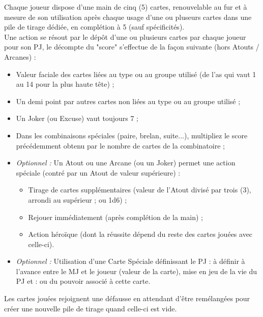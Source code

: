 \documentclass[11pt,twoside,a4paper]{article}
\begin{document}
Chaque joueur dispose d'une main de cinq (5) cartes, renouvelable au fur et {\`a} mesure de son utilisation apr{\`e}s chaque usage d'une ou pluseurs cartes dans une pile de tirage d{\'e}di{\'e}e, en compl{\'e}tion {\`a} 5 (sauf sp{\'e}cificit{\'e}s).~\\
Une action se r{\'e}sout par le d{\'e}p{\^o}t d'une ou plusieurs cartes par chaque joueur pour son PJ, le d{\'e}compte du "score" s'effectue de la fa\c{c}on suivante (hors Atouts / Arcanes) : 
\begin{itemize}
	\item Valeur faciale des cartes li{\'e}es au type ou au groupe utilis{\'e} (de l'as qui vaut 1 au 14 pour la plus haute t{\^e}te) ; 
	\item Un demi point par autres cartes non li{\'e}es au type ou au groupe utilis{\'e} ; 
	\item Un Joker (ou Excuse) vaut toujours 7 ; 
	\item Dans les combinaisons sp{\'e}ciales (paire, brelan, suite...), multipliez le score pr{\'e}c{\'e}demment obtenu par le nombre de cartes de la combinatoire ; 
	\item \emph{Optionnel : }Un Atout ou une Arcane (ou un Joker) permet une action sp{\'e}ciale (contr{\'e} par un Atout de valeur sup{\'e}rieure) : 
	\begin{itemize}
		\item Tirage de cartes suppl{\'e}mentaires (valeur de l'Atout divis{\'e} par trois (3), arrondi au sup{\'e}rieur ; ou 1d6) ; 
		\item Rejouer imm{\'e}diatement (apr{\`e}s compl{\'e}tion de la main) ; 
		\item Action h{\'e}ro{\"i}que (dont la r{\'e}ussite d{\'e}pend du reste des cartes jou{\'e}es avec celle-ci). 
	\end{itemize}
	\item \emph{Optionnel : }Utilisation d'une Carte Sp{\'e}ciale d{\'e}finissant le PJ : {\`a} d{\'e}finir {\`a} l'avance entre le MJ et le joueur (valeur de la carte), mise en jeu de la vie du PJ et : ou du pouvoir associ{\'e} {\`a} cette carte. 
\end{itemize} %

Les cartes jou{\'e}es rejoignent une d{\'e}fausse en attendant d'{\^e}tre rem{\'e}lang{\'e}es pour cr{\'e}er une nouvelle pile de tirage quand celle-ci est vide.~\\

\clearpage 
\end{document}
